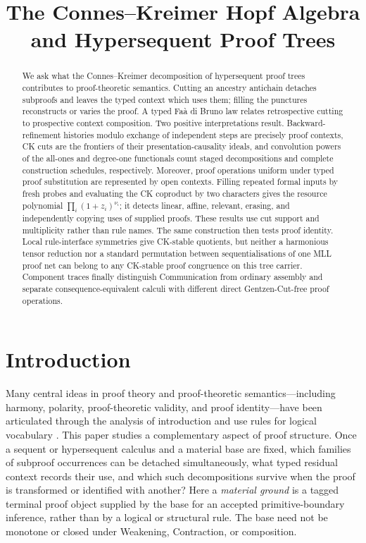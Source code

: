 \documentclass[10pt,a4paper]{article}
\title{The Connes--Kreimer Hopf Algebra and Hypersequent Proof Trees}
\author{}
\date{}
\theoremstyle{plain}
\theoremstyle{definition}
\theoremstyle{remark}
\begin{document}
\maketitle

\begin{abstract}
We ask what the Connes--Kreimer decomposition of hypersequent proof trees
contributes to proof-theoretic semantics.  Cutting an ancestry antichain
detaches subproofs and leaves the typed context which uses them; filling the
punctures reconstructs or varies the proof.  A typed Fa\`a di Bruno law relates
retrospective cutting to prospective context composition.  Two positive
interpretations result.  Backward-refinement histories modulo exchange of
independent steps are precisely proof contexts, CK cuts are the frontiers of
their presentation-causality ideals, and convolution powers of the all-ones
and degree-one functionals count staged decompositions and complete
construction schedules, respectively.
Moreover, proof operations uniform under typed proof substitution are
represented by open contexts.  Filling repeated formal inputs by fresh probes
and evaluating the CK coproduct by two characters gives the resource polynomial
\(\prod_i(1+z_i)^{\nu_i}\); it detects linear, affine, relevant, erasing, and
independently copying uses of supplied proofs.  These results use cut support
and multiplicity rather than rule names.  The same construction then tests
proof identity.  Local rule-interface symmetries give CK-stable quotients, but
neither a harmonious tensor reduction nor a standard permutation between
sequentialisations of one MLL proof net can belong to any CK-stable proof
congruence on this tree carrier.  Component traces finally distinguish
Communication from ordinary assembly and separate consequence-equivalent
calculi with different direct Gentzen-Cut-free proof operations.
\end{abstract}

\section*{Introduction}

Many central ideas in proof theory and proof-theoretic semantics---including
harmony, polarity, proof-theoretic validity, and proof identity---have been
articulated through the analysis of introduction and use rules for logical
vocabulary
\cite{prawitz1965,dummett1991,schroederheister2015,
pistonetranchini2024}.  This paper studies a complementary aspect of proof
structure.  Once a sequent or hypersequent calculus and a material base are
fixed, which families of subproof occurrences can be detached
simultaneously, what typed residual context records their use, and which
such decompositions survive when the proof is transformed or identified
with another?  Here a \emph{material ground} is a tagged terminal proof
object supplied by the base for an accepted primitive-boundary inference,
rather than by a logical or structural rule.  The base need not be monotone
or closed under Weakening, Contraction, or composition.
\end{document}
